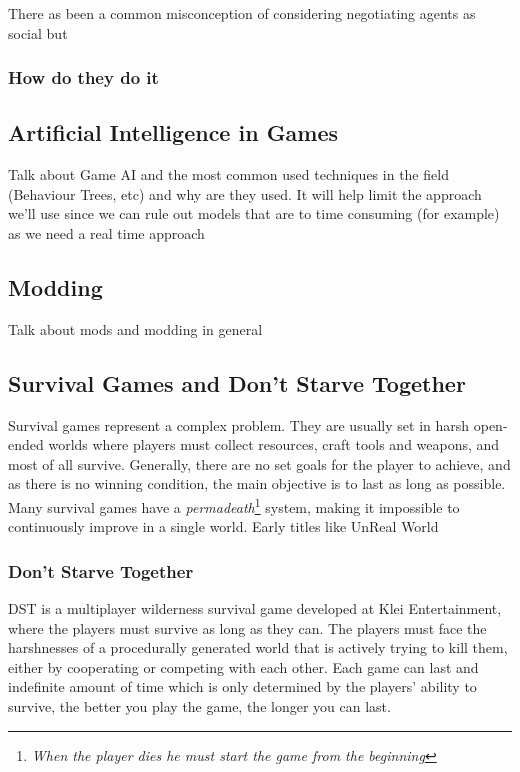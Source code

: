 There as been a common misconception of considering negotiating agents as social but 

\subsubsection{How do they do it}

\subsection{Artificial Intelligence in Games}
Talk about Game AI and the most common used techniques in the field (Behaviour Trees, etc) and why are they used.
It will help limit the approach we'll use since we can rule out models that are to time consuming (for example) as we need a real time approach

\subsection{Modding}
Talk about mods and modding in general

\subsection{Survival Games and Don't Starve Together}
Survival games represent a complex problem.
They are usually set in harsh open-ended worlds where players must collect resources, craft tools and weapons, and most of all survive.
Generally, there are no set goals for the player to achieve, and as there is no winning condition, the main objective is to last as long as possible. 
Many survival games have a \textit{permadeath}\footnote{\textit{When the player dies he must start the game from the beginning}} system, making it impossible to continuously improve in a single world.
Early titles like UnReal World

\subsubsection{Don't Starve Together}
\ac{DST} is a multiplayer wilderness survival game developed at Klei Entertainment, where the players must survive as long as they can.
The players must face the harshnesses of a procedurally generated world that is actively trying to kill them, either by cooperating or competing with each other.
Each game can last and indefinite amount of time which is only determined by the players' ability to survive, the better you play the game, the longer you can last.

